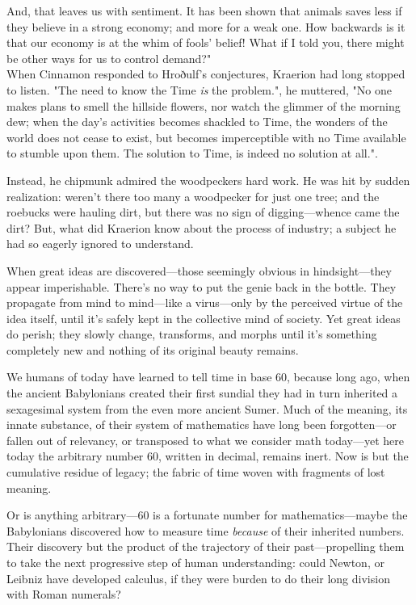 And, that leaves us with sentiment. It has been shown that animals saves less if they believe in a strong economy; and more for a weak one. How backwards is it that our economy is at the whim of fools' belief! What if I told you, there might be other ways for us to control demand?"\\

When Cinnamon responded to Hroðulf's conjectures, Kraerion had long stopped to listen. "The need to know the Time \textit{is} the problem.", he muttered, "No one makes plans to smell the hillside flowers, nor watch the glimmer of the morning dew; when the day's activities becomes shackled to Time, the wonders of the world does not cease to exist, but becomes imperceptible with no Time available to stumble upon them. The solution to Time, is indeed no solution at all.". 

Instead, he chipmunk admired the woodpeckers hard work. He was hit by sudden realization: weren't there too many a woodpecker for just one tree; and the roebucks were hauling dirt, but there was no sign of digging---whence came the dirt? But, what did Kraerion know about the process of industry; a subject he had so eagerly ignored to understand.\\

\renewcommand*{\thepage}{\footnotesize \mayadigit{42}}

When great ideas are discovered---those seemingly obvious in hindsight---they appear imperishable. There's no way to put the genie back in the bottle. They propagate from mind to mind---like a virus---only by the perceived virtue of the idea itself, until it's safely kept in the collective mind of society. Yet great ideas do perish; they slowly change, transforms, and morphs until it's something completely new and nothing of its original beauty remains.

We humans of today have learned to tell time in base 60, because long ago, when the ancient Babylonians created their first sundial they had in turn inherited a sexagesimal system from the even more ancient Sumer. Much of the meaning, its innate substance, of their system of mathematics have long been forgotten---or fallen out of relevancy, or transposed to what we consider math today---yet here today the arbitrary number 60, written in decimal, remains inert. Now is but the cumulative residue of legacy; the fabric of time woven with fragments of lost meaning.

Or is anything arbitrary---60 is a fortunate number for mathematics---maybe the Babylonians discovered how to measure time \textit{because} of their inherited numbers. Their discovery but the product of the trajectory of their past---propelling them to take the next progressive step of human understanding: could Newton, or Leibniz have developed calculus, if they were burden to do their long division with Roman numerals?

